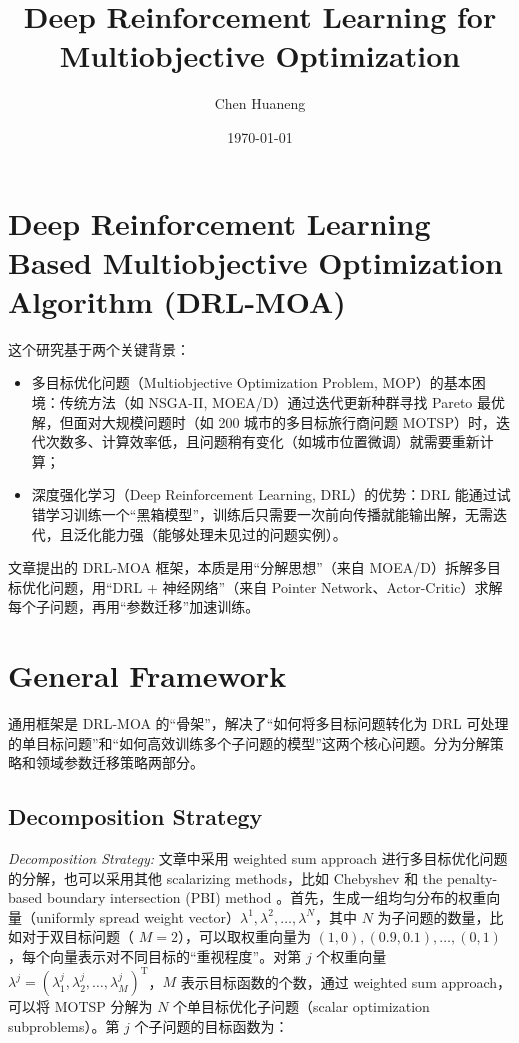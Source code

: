 \documentclass[fontset=none]{ctexart}
\title{Deep Reinforcement Learning for Multiobjective Optimization}
\author{Chen Huaneng}
\date{\today}
\begin{document}
\maketitle

\section{Deep Reinforcement Learning Based Multiobjective Optimization Algorithm (DRL-MOA)}

这个研究基于两个关键背景：

\begin{itemize}
    \item 多目标优化问题（Multiobjective Optimization Problem, MOP）的基本困境：传统方法（如 NSGA-II, MOEA/D）通过迭代更新种群寻找 Pareto 最优解，但面对大规模问题时（如 200 城市的多目标旅行商问题 MOTSP）时，迭代次数多、计算效率低，且问题稍有变化（如城市位置微调）就需要重新计算；
    \item 深度强化学习（Deep Reinforcement Learning, DRL）的优势：DRL 能通过试错学习训练一个“黑箱模型”，训练后只需要一次前向传播就能输出解，无需迭代，且泛化能力强（能够处理未见过的问题实例）。
\end{itemize}

文章\cite{liDeepReinforcementLearning2021}提出的 DRL-MOA 框架，本质是用“分解思想”（来自 MOEA/D\cite{zhangMOEAMultiobjectiveEvolutionary2007}）拆解多目标优化问题，用“DRL + 神经网络”（来自 Pointer Network\cite{vinyalsPointerNetworks2015}、Actor-Critic\cite{nazariReinforcementLearningSolving2018,belloNeuralCombinatorialOptimization2017}）求解每个子问题，再用“参数迁移”加速训练。

\section{General Framework}

通用框架是 DRL-MOA 的“骨架”，解决了“如何将多目标问题转化为 DRL 可处理的单目标问题”和“如何高效训练多个子问题的模型”这两个核心问题。分为分解策略和领域参数迁移策略两部分。

\subsection{Decomposition Strategy}

\textit{Decomposition Strategy:} 文章中采用 weighted sum approach \cite{miettinen1999nonlinear} 进行多目标优化问题的分解，也可以采用其他 scalarizing methods，比如 Chebyshev 和 the penalty-based boundary intersection (PBI) method \cite{7572016,7390047}。首先，生成一组均匀分布的权重向量（uniformly spread weight vector）$\lambda^1, \lambda^2, \ldots, \lambda^N$，其中 $N$ 为子问题的数量，比如对于双目标问题（ $M = 2$），可以取权重向量为 $(1,0), (0.9,0.1), \ldots, (0,1)$，每个向量表示对不同目标的“重视程度”。对第 $j$ 个权重向量 $\lambda^j = (\lambda^j_1, \lambda^j_2, \ldots, \lambda^j_M)^{\mathrm{T}}$，$M$ 表示目标函数的个数，通过 weighted sum approach，可以将 MOTSP 分解为 $N$ 个单目标优化子问题（scalar optimization subproblems）。第 $j$ 个子问题的目标函数为：
\end{document}
